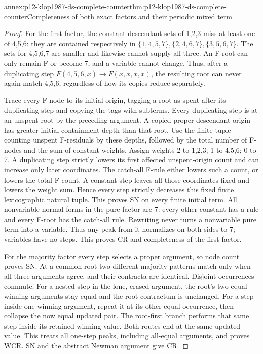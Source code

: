 \begin{annexitem}{annex:p12-klop1987-ds-complete-counter}{thm:p12-klop1987-ds-complete-counter}{Completeness of both exact factors and their periodic mixed term}
\begin{proof}
For the first factor, the constant descendant sets of 1,2,3 miss
at least one of 4,5,6: they are contained respectively in
\(\{1,4,5,7\},\{2,4,6,7\},\{3,5,6,7\}\).
The sets for 4,5,6,7 are smaller and likewise cannot supply all
three. An F-root can only remain F or become 7, and a variable
cannot change. Thus, after a duplicating step
\(F(4,5,6,x)\to F(x,x,x,x)\), the resulting root can never
again match 4,5,6, regardless of how its copies reduce separately.

Trace every F-node to its initial origin, tagging a root as
spent after its duplicating step and copying the tags with subterms.
Every duplicating step is at an unspent root by the preceding
argument. A copied proper descendant origin has greater initial
containment depth than that root. Use the finite tuple counting
unspent F-residuals by these depths, followed by the total number
of F-nodes and the sum of constant weights. Assign weights 2 to
1,2,3; 1 to 4,5,6; 0 to 7. A duplicating step strictly lowers its
first affected unspent-origin count and can increase only later
coordinates. The catch-all F-rule either lowers such a count,
or lowers the total F-count. A constant step leaves all those
coordinates fixed and lowers the weight sum. Hence every step
strictly decreases this fixed finite lexicographic natural tuple.
This proves SN on every finite initial term. All nonvariable
normal forms in the pure factor are 7: every other constant has
a rule and every F-root has the catch-all rule. Rewriting never
turns a nonvariable pure term into a variable. Thus any peak
from it normalizes on both sides to 7; variables have no steps.
This proves CR and completeness of the first factor.

For the majority factor every step selects a proper argument,
so node count proves SN. At a common root two different majority
patterns match only when all three arguments agree, and their
contracta are identical. Disjoint occurrences commute. For a
nested step in the lone, erased argument, the root's two equal
winning arguments stay equal and the root contractum is unchanged.
For a step inside one winning argument, repeat it at its other
equal occurrence, then collapse the now equal updated pair.
The root-first branch performs that same step inside its retained
winning value. Both routes end at the same updated value.
This treats all one-step peaks, including all-equal arguments,
and proves WCR. SN and the abstract Newman argument give CR.


\end{proof}
\end{annexitem}
